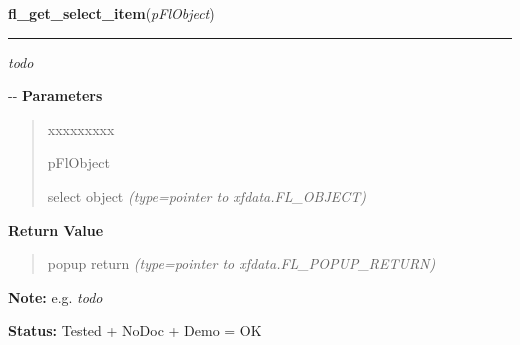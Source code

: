 \hspace{.8\funcindent}\begin{boxedminipage}{\funcwidth}

    \raggedright \textbf{fl\_get\_select\_item}(\textit{pFlObject})

    \vspace{-1.5ex}

    \rule{\textwidth}{0.5\fboxrule}
\setlength{\parskip}{2ex}

\emph{todo}

-{}-
\setlength{\parskip}{1ex}
      \textbf{Parameters}
      \vspace{-1ex}

      \begin{quote}
        \begin{Ventry}{xxxxxxxxx}

          \item[pFlObject]


select object
            {\it (type=pointer to xfdata.FL\_OBJECT)}

        \end{Ventry}

      \end{quote}

      \textbf{Return Value}
    \vspace{-1ex}

      \begin{quote}

popup return
      {\it (type=pointer to xfdata.FL\_POPUP\_RETURN)}

      \end{quote}

\textbf{Note:} 
e.g. \emph{todo}


\textbf{Status:} 
Tested + NoDoc + Demo = OK


    \end{boxedminipage}

    \label{xformslib:flselect:fl_set_select_item}

    \vspace{0.5ex}

